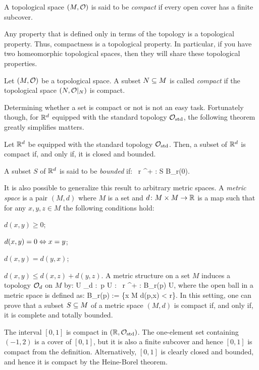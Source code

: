 \bd
A topological space $(M,\mathcal{O})$ is said to be \emph{compact} if every open cover has a finite subcover.
\ed

Any property that is defined only in terms of the topology is a topological
property. Thus, compactness is a topological property. In particular, if you
have two homeomorphic topological spaces, then they will share these
topological properties.

\bd
Let $(M,\mathcal{O})$ be a topological space. A subset $N\subseteq M$ is called \emph{compact} if the topological space $(N,\mathcal{O}|_N)$ is compact.
\ed

Determining whether a set is compact or not is not an easy task. Fortunately though, for $\mathbb{R}^d$ equipped with the standard topology $\mathcal{O}_\mathrm{std}$, the following theorem greatly simplifies matters.

Let $\mathbb{R}^d$ be equipped with the standard topology $\mathcal{O}_\mathrm{std}$. Then, a subset of $\mathbb{R}^d$ is compact if, and only if, it is closed and bounded.
\et

A subset $S$ of $\mathbb{R}^d$ is said to be \emph{bounded} if:
\bse
\exists \, r \in \R^+ : S \se B_r(0). 
\ese

\br
It is also possible to generalize this result to arbitrary metric spaces. A \emph{metric space} is a pair $(M,d)$ where $M$ is a set and $d\colon M\times M \to \mathbb{R}$ is a map such that for any $x,y,z \in M$ the following conditions hold:
\ben
\item[i)] $d(x,y) \geq 0$;
\item[ii)] $d(x,y) = 0 \Leftrightarrow x = y$;
\item[iii)] $d(x,y) = d(y,x) $;
\item[iv)] $d(x,y)\leq d(x,z)+d(y,z)$.
\een
A metric structure on a set $M$ induces a topology $\mathcal{O}_d$ on $M$ by:
\bse
U \in \cO_d :\eqv \forall \, p \in U : \exists \, r \in \R^+ : B_r(p) \se U,
\ese
where the open ball in a metric space is defined as:
\bse
B_r(p) := \{x \in M \mid d(p,x) < r\}.
\ese
In this setting, one can prove that a subset $S\subseteq M$ of a metric space $(M,d)$ is compact if, and only if, it is complete and totally bounded.
\er

\be
The interval $[0,1]$ is compact in $(\mathbb{R},\mathcal{O}_\mathrm{std})$. The one-element set containing $(-1,2)$ is a cover of $[0,1]$, but it is also a finite subcover and hence $[0,1]$ is compact from the definition. Alternatively, $[0,1]$ is clearly closed and bounded, and hence it is compact by the Heine-Borel theorem.
\ee


